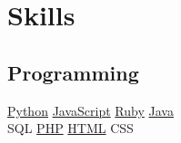 \documentclass[]{joaosoares-resume}
\begin{document}
\begin{minipage}[t]{0.39\textwidth}




\section{Skills}

\subsection{Programming}
\href{http://www.python.org}{Python} \textbullet{}
\href{http://www.php.net}{JavaScript} \textbullet{}
\href{https://www.ruby-lang.org/}{Ruby} \textbullet{}
\href{https://www.oracle.com/java/}{Java}\\
SQL \textbullet{}
\href{http://www.php.net}{PHP} \textbullet{}
\href{https://www.w3schools.com/html/}{HTML} \textbullet{}
CSS  \\
\sectionsep


\end{minipage}
\end{document}
